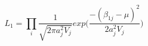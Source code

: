 \begin{equation}
\label{mle}
L_1 = \prod\limits_i\frac{1}{\sqrt{2\pi a_j^2 V_j}}exp\Big(\frac{-(\beta_{1j}- \mu)^2}{2 a_j^2 V_j}\Big)
\end{equation}



